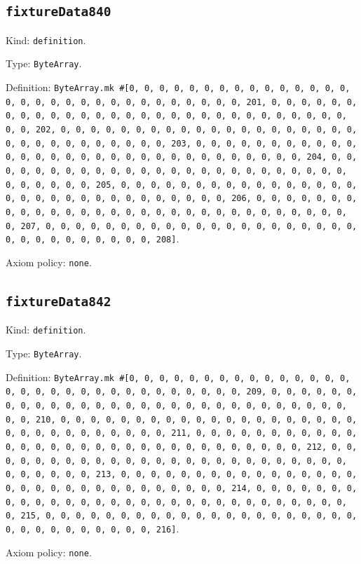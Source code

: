 \documentclass[11pt]{article}
\begin{document}
\subsection*{\texttt{fixtureData840}}
\noindent Kind: \texttt{definition}.\par
\noindent Type: \texttt{ByteArray}.\par
\noindent Definition: \texttt{ByteArray.mk \#[0, 0, 0, 0, 0, 0, 0, 0, 0, 0, 0, 0, 0, 0, 0, 0, 0, 0, 0, 0, 0, 0, 0, 0, 0, 0, 0, 0, 0, 0, 0, 201, 0, 0, 0, 0, 0, 0, 0, 0, 0, 0, 0, 0, 0, 0, 0, 0, 0, 0, 0, 0, 0, 0, 0, 0, 0, 0, 0, 0, 0, 0, 0, 202, 0, 0, 0, 0, 0, 0, 0, 0, 0, 0, 0, 0, 0, 0, 0, 0, 0, 0, 0, 0, 0, 0, 0, 0, 0, 0, 0, 0, 0, 0, 0, 203, 0, 0, 0, 0, 0, 0, 0, 0, 0, 0, 0, 0, 0, 0, 0, 0, 0, 0, 0, 0, 0, 0, 0, 0, 0, 0, 0, 0, 0, 0, 0, 204, 0, 0, 0, 0, 0, 0, 0, 0, 0, 0, 0, 0, 0, 0, 0, 0, 0, 0, 0, 0, 0, 0, 0, 0, 0, 0, 0, 0, 0, 0, 0, 205, 0, 0, 0, 0, 0, 0, 0, 0, 0, 0, 0, 0, 0, 0, 0, 0, 0, 0, 0, 0, 0, 0, 0, 0, 0, 0, 0, 0, 0, 0, 0, 206, 0, 0, 0, 0, 0, 0, 0, 0, 0, 0, 0, 0, 0, 0, 0, 0, 0, 0, 0, 0, 0, 0, 0, 0, 0, 0, 0, 0, 0, 0, 0, 207, 0, 0, 0, 0, 0, 0, 0, 0, 0, 0, 0, 0, 0, 0, 0, 0, 0, 0, 0, 0, 0, 0, 0, 0, 0, 0, 0, 0, 0, 0, 0, 208]}.\par
\noindent Axiom policy: \texttt{none}.\par
\subsection*{\texttt{fixtureData842}}
\noindent Kind: \texttt{definition}.\par
\noindent Type: \texttt{ByteArray}.\par
\noindent Definition: \texttt{ByteArray.mk \#[0, 0, 0, 0, 0, 0, 0, 0, 0, 0, 0, 0, 0, 0, 0, 0, 0, 0, 0, 0, 0, 0, 0, 0, 0, 0, 0, 0, 0, 0, 0, 209, 0, 0, 0, 0, 0, 0, 0, 0, 0, 0, 0, 0, 0, 0, 0, 0, 0, 0, 0, 0, 0, 0, 0, 0, 0, 0, 0, 0, 0, 0, 0, 210, 0, 0, 0, 0, 0, 0, 0, 0, 0, 0, 0, 0, 0, 0, 0, 0, 0, 0, 0, 0, 0, 0, 0, 0, 0, 0, 0, 0, 0, 0, 0, 211, 0, 0, 0, 0, 0, 0, 0, 0, 0, 0, 0, 0, 0, 0, 0, 0, 0, 0, 0, 0, 0, 0, 0, 0, 0, 0, 0, 0, 0, 0, 0, 212, 0, 0, 0, 0, 0, 0, 0, 0, 0, 0, 0, 0, 0, 0, 0, 0, 0, 0, 0, 0, 0, 0, 0, 0, 0, 0, 0, 0, 0, 0, 0, 213, 0, 0, 0, 0, 0, 0, 0, 0, 0, 0, 0, 0, 0, 0, 0, 0, 0, 0, 0, 0, 0, 0, 0, 0, 0, 0, 0, 0, 0, 0, 0, 214, 0, 0, 0, 0, 0, 0, 0, 0, 0, 0, 0, 0, 0, 0, 0, 0, 0, 0, 0, 0, 0, 0, 0, 0, 0, 0, 0, 0, 0, 0, 0, 215, 0, 0, 0, 0, 0, 0, 0, 0, 0, 0, 0, 0, 0, 0, 0, 0, 0, 0, 0, 0, 0, 0, 0, 0, 0, 0, 0, 0, 0, 0, 0, 216]}.\par
\noindent Axiom policy: \texttt{none}.\par
\end{document}
